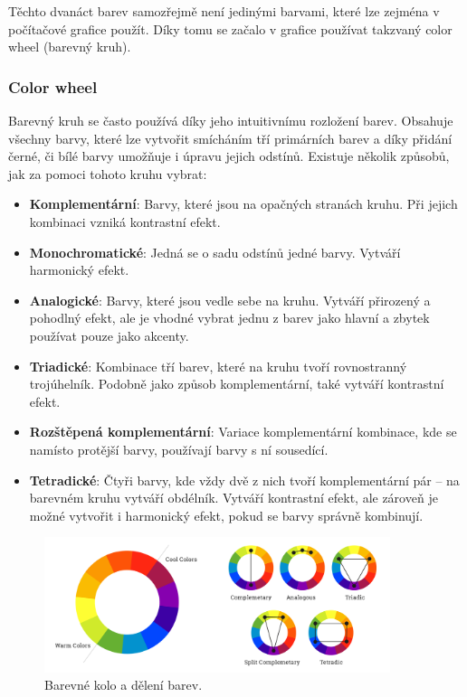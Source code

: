 Těchto dvanáct barev samozřejmě není jedinými barvami, které lze zejména v počítačové grafice použít. Díky tomu se začalo v grafice používat takzvaný color wheel (barevný kruh).\cite{color_theory_design}

\subsubsection*{Color wheel}
Barevný kruh se často používá díky jeho intuitivnímu rozložení barev. Obsahuje všechny barvy, které lze vytvořit smícháním tří primárních barev a díky přidání černé, či bílé barvy umožňuje i úpravu jejich odstínů. Existuje několik způsobů, jak za pomoci tohoto kruhu vybrat:\cite{color_wheel,color_schemes}
\begin{itemize}
    \item \textbf{Komplementární}: Barvy, které jsou na opačných stranách kruhu. Při jejich kombinaci vzniká kontrastní efekt.
    \item \textbf{Monochromatické}: Jedná se o sadu odstínů jedné barvy. Vytváří harmonický efekt.
    \item \textbf{Analogické}: Barvy, které jsou vedle sebe na kruhu. Vytváří přirozený a pohodlný efekt, ale je vhodné vybrat jednu z barev jako hlavní a zbytek používat pouze jako akcenty.
    \item \textbf{Triadické}: Kombinace tří barev, které na kruhu tvoří rovnostranný trojúhelník. Podobně jako způsob komplementární, také vytváří kontrastní efekt.
    \item \textbf{Rozštěpená komplementární}: Variace komplementární kombinace, kde se namísto protější barvy, používají barvy s ní sousedící. 
    \item \textbf{Tetradické}: Čtyři barvy, kde vždy dvě z nich tvoří komplementární pár -- na barevném kruhu vytváří obdélník. Vytváří kontrastní efekt, ale zároveň je možné vytvořit i harmonický efekt, pokud se barvy správně kombinují.
\end{itemize}

\begin{figure}[H]
    \centering
    \includegraphics[width=0.9\textwidth]{resources/figures/color_theory.png}
    \caption{Barevné kolo a dělení barev.\cite{color_schemes}}
    \label{fig:color_theory}
\end{figure}

